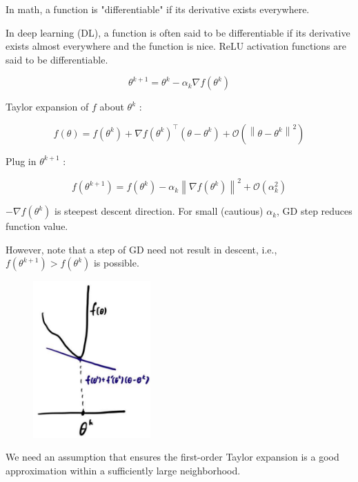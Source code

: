 \documentclass{report}
\begin{document}
In math, a function is "differentiable" if its derivative exists everywhere.

In deep learning (DL), a function is often said to be differentiable if its derivative exists almost everywhere and the function is nice.
ReLU activation functions are said to be differentiable.

\begin{concept}
    $$
    \theta^{k+1}=\theta^{k}-\alpha_{k} \nabla f\left(\theta^{k}\right)
    $$

    Taylor expansion of $f$ about $\theta^{k}$ :

    $$
    f(\theta)=f\left(\theta^{k}\right)+\nabla f\left(\theta^{k}\right)^{\top}\left(\theta-\theta^{k}\right)+\mathcal{O}\left(\left\|\theta-\theta^{k}\right\|^{2}\right)
    $$

    Plug in $\theta^{k+1}$ :

    $$
    f\left(\theta^{k+1}\right)=f\left(\theta^{k}\right)-\alpha_{k}\left\|\nabla f\left(\theta^{k}\right)\right\|^{2}+\mathcal{O}\left(\alpha_{k}^{2}\right)
    $$

    $-\nabla f\left(\theta^{k}\right)$ is steepest descent direction. For small (cautious) $\alpha_{k}$, GD step reduces function value.
\end{concept}

However, note that a step of GD need not result in descent, i.e., $f\left(\theta^{k+1}\right)>f\left(\theta^{k}\right)$ is possible.

\begin{figure}[H]
    \centering
    \includegraphics[width=0.4\textwidth]{.././assets/2.1.png}
\end{figure}

We need an assumption that ensures the first-order Taylor expansion is a good approximation within a sufficiently large neighborhood.
\end{document}
